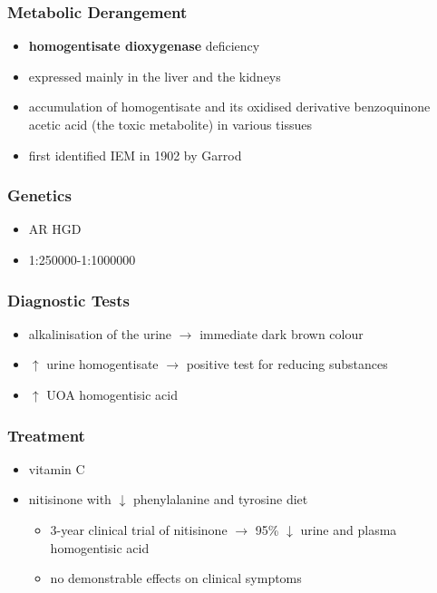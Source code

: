 \documentclass[12pt]{scrartcl}
\begin{document}
\subsubsection{Metabolic Derangement}
\label{sec:org6d1b412}
\begin{itemize}
\item \textbf{homogentisate dioxygenase} deficiency
\end{itemize}

\begin{itemize}
\item expressed mainly in the liver and the kidneys
\item accumulation of homogentisate and its oxidised derivative
benzoquinone acetic acid (the toxic metabolite) in various tissues
\item first identified IEM in 1902 by Garrod
\end{itemize}

\subsubsection{Genetics}
\label{sec:org451cddf}
\begin{itemize}
\item AR HGD
\item 1:250000-1:1000000
\end{itemize}
\subsubsection{Diagnostic Tests}
\label{sec:org78c72c1}
\begin{itemize}
\item alkalinisation of the urine \(\to\) immediate dark brown colour
\item \(\uparrow\) urine homogentisate \(\to\) positive test for reducing substances
\item \(\uparrow\) UOA homogentisic acid
\end{itemize}
\subsubsection{Treatment}
\label{sec:orgacc6ee0}
\begin{itemize}
\item vitamin C
\item nitisinone with \(\downarrow\) phenylalanine and tyrosine diet
\begin{itemize}
\item 3-year clinical trial of nitisinone \(\to\) 95\% \(\downarrow\) urine and plasma homogentisic acid
\item no demonstrable effects on clinical symptoms
\end{itemize}
\end{itemize}
\end{document}

